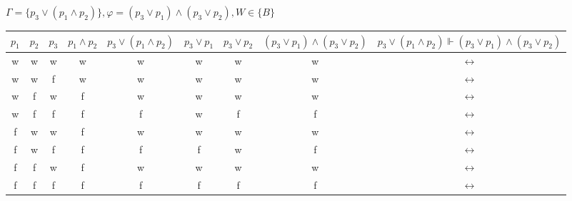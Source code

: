 \documentclass[10pt, a4paper]{exam}
\begin{document}
\begin{questions}
\begin{parts}
\begin{subparts}
            \subpart $\Gamma=\{p_3\vee(p_1\wedge p_2)\}, \varphi=(p_3\vee p_1)\wedge(p_3\vee p_2), W\in\{B\}$
            \begin{solution}

                \begin{tabular}{c | c | c | c | c | c | c | c | c}
                    $p_1$ & $p_2$ & $p_3$ & $p_1\wedge p_2$ & $p_3\vee(p_1\wedge p_2)$ & $p_3\vee p_1$ & $p_3\vee p_2$ & $(p_3\vee p_1)\wedge(p_3\vee p_2)$ & $p_3\vee(p_1\wedge p_2) \Vdash (p_3\vee p_1)\wedge(p_3\vee p_2)$ \\\hline
                    w     & w     & w     & w               & w                        & w             & w             & w                                  & $\leftrightarrow$                                                \\
                    w     & w     & f     & w               & w                        & w             & w             & w                                  & $\leftrightarrow$                                                \\
                    w     & f     & w     & f               & w                        & w             & w             & w                                  & $\leftrightarrow$                                                \\
                    w     & f     & f     & f               & f                        & w             & f             & f                                  & $\leftrightarrow$                                                \\
                    f     & w     & w     & f               & w                        & w             & w             & w                                  & $\leftrightarrow$                                                \\
                    f     & w     & f     & f               & f                        & f             & w             & f                                  & $\leftrightarrow$                                                \\
                    f     & f     & w     & f               & w                        & w             & w             & w                                  & $\leftrightarrow$                                                \\
                    f     & f     & f     & f               & f                        & f             & f             & f                                  & $\leftrightarrow$                                                \\
                \end{tabular}
            \end{solution}
        \end{subparts}


\end{parts}
\end{questions}
\end{document}

